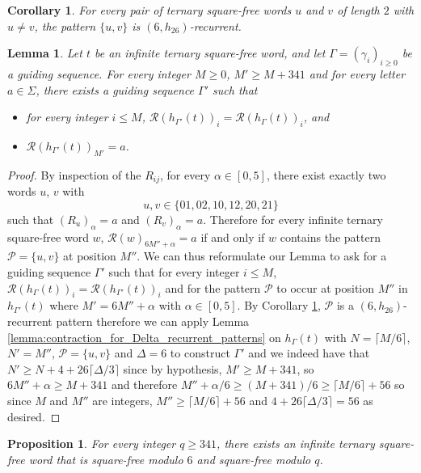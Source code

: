 \documentclass[12pt]{article}
\newtheorem{proposition}[theorem]{Proposition}
\newtheorem{corollary}[theorem]{Corollary}
\newtheorem{lemma}[theorem]{Lemma}
\theoremstyle{definition}
\begin{document}
\begin{corollary}\label{cor:u_v_size_2_6_recurrent}
    For every pair of ternary square-free words $u$ and $v$ of length $2$ with $u \neq v$, the pattern $\{u, v\}$ is $(6, h_{26})$-recurrent.
\end{corollary}

\begin{lemma}\label{lemma:shift_in_6_completions}
Let $t$ be an infinite ternary square-free word, and let $\Gamma = (\gamma_i)_{i \ge 0}$ be a guiding sequence. For every integer $M \ge 0$, $M' \ge M + 341$ and for every letter $a \in \Sigma$, 
there exists a guiding sequence $\Gamma'$ such that
    \begin{itemize}
        \item for every integer $i \le M$, $\mathcal{R}(h_{\Gamma'}(t))_i = \mathcal{R}(h_\Gamma(t))_i$, and
        \item $\mathcal{R}(h_{\Gamma'}(t))_{M'} = a$. 
    \end{itemize}
\end{lemma}
\begin{proof}
    By inspection of the $R_{ij}$, for every $\alpha \in [0, 5]$, there exist exactly two words $u$, $v$ with 
    \[u,v \in \{01, 02, 10, 12, 20, 21\}\]
    such that $(R_u)_\alpha = a$ and $(R_v)_\alpha = a$. Therefore for every infinite ternary square-free word $w$, $\mathcal{R}(w)_{6M'' + \alpha} = a$ if and only if $w$ contains the pattern $\mathcal{P} = \{u, v\}$ at position $M''$.
    We can thus reformulate our Lemma to ask for a guiding sequence $\Gamma'$ such that for every integer $i \le M$, $\mathcal{R}(h_\Gamma(t))_i = \mathcal{R}(h_{\Gamma'}(t))_i$ and for the pattern $\mathcal{P}$ to occur at position $M''$ in $h_{\Gamma'}(t)$ where 
    $M' = 6M'' + \alpha$ with $\alpha \in [0, 5]$. By Corollary  \ref{cor:u_v_size_2_6_recurrent}, $\mathcal{P}$ is a $(6, h_{26})$-recurrent pattern therefore we can apply Lemma \ref{lemma:contraction_for_Delta_recurrent_patterns} on $h_\Gamma(t)$ with $N = \lceil M/6\rceil$, $N' = M''$, $\mathcal{P} = \{u, v\}$ and $\Delta = 6$ to construct $\Gamma'$ and we indeed have that $N' \ge N + 4 + 26\lceil\Delta/3\rceil$ since by hypothesis, $M' \ge M + 341$, so $6M''+\alpha \ge  M + 341$ and therefore $M'' + \alpha/6 \ge (M + 341)/6 \ge \lceil M/6\rceil + 56$ so since $M$ and $M''$ are integers, $M'' \ge \lceil M/6\rceil + 56$
    and $4 + 26\lceil\Delta/3\rceil = 56$ as desired.
\end{proof}

\begin{proposition}\label{prop:p=6}
    For every integer $q \ge 341$, there exists an infinite ternary square-free word that is square-free modulo $6$ and square-free modulo $q$.
\end{proposition}
\end{document}
